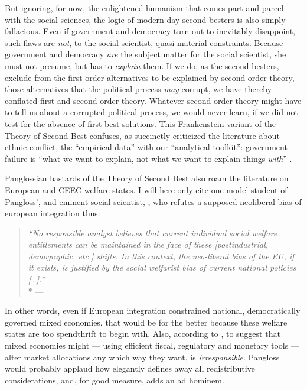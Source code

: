 But ignoring, for now, the enlightened humanism that comes part and parcel with the social sciences, the logic of modern-day second-besters is also simply fallacious.
Even if government and democracy turn out to inevitably disappoint, such flaws are \emph{not}, to the social scientist, quasi-material constraints.
Because government and democracy \emph{are} the subject matter for the social scientist, she must not presume, but has to \emph{explain} them.
If we do, as the second-besters, exclude from the first-order alternatives to be explained by second-order theory, those alternatives that the political process \emph{may} corrupt, we have thereby conflated first and second-order theory.
Whatever second-order theory might have to tell us about a corrupted political process, we would never learn, if we did not test for the absence of first-best solutions.
This Frankenstein variant of the Theory of Second Best confuses, as \cite{Brubaker-2002-aa} succinctly criticized the literature about ethnic conflict, the ``empirical data'' with our ``analytical toolkit'':
government failure is ``what we want to explain, not what we want to explain things \emph{with}'' \citeyearpar[165, emphasis in original]{Brubaker-2002-aa}.

Panglossian bastards of the Theory of Second Best also roam the literature on European and \gls{CEEC} welfare states.
I will here only cite one model student of Pangloss', and eminent social scientist, \citeauthor{Moravcsik-2002-aa}, who refutes a supposed neoliberal bias of european integration thus:

\begin{quote}
	\emph{``No responsible analyst believes that current individual social welfare entitlements can be maintained in the face of these [postindustrial, demographic, etc.] shifts.
	In this context, the neo-liberal bias of the \gls{EU}, if it exists, is justified by the social welfarist bias of current national policies [\ldots].''}
	\\*
	--- \citet[618]{Moravcsik-2002-aa}
\end{quote}

In other words, even if European integration constrained national, democratically governed mixed economies, that would be for the better because these welfare states are too spendthrift to begin with.
Also, according to \citeauthor{Moravcsik-2002-aa}, to suggest that mixed economies might --- using efficient fiscal, regulatory and monetary tools --- alter market allocations any which way they want, is \emph{irresponsible}.
Pangloss would probably applaud how elegantly \citeauthor{Moravcsik-2002-aa} defines away all redistributive considerations, and, for good measure, adds an ad hominem.

